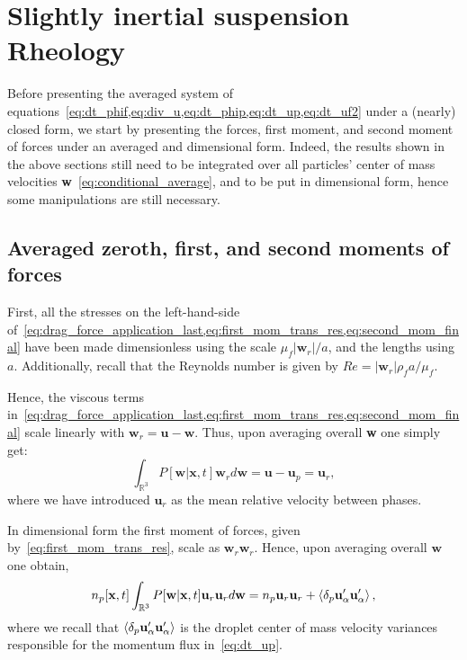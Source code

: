 
\section{Slightly inertial suspension Rheology}\label{sec:averaged_equations}
Before presenting the averaged system of equations~\eqref{eq:dt_phif,eq:div_u,eq:dt_phip,eq:dt_up,eq:dt_uf2} under a (nearly) closed form, we start by presenting the forces, first moment, and second moment of forces  under an  averaged and dimensional form. 
Indeed, the results shown in the above sections still need to be integrated over all particles' center of mass velocities \textbf{w}~\eqref{eq:conditional_average}, and to be put in dimensional form, hence some manipulations are still necessary.



\subsection{Averaged zeroth, first, and second moments of forces}

First, all the stresses on the left-hand-side of~\ref{eq:drag_force_application_last,eq:first_mom_trans_res,eq:second_mom_final} have been made dimensionless using the scale $\mu_f |\textbf{w}_r|/a$, and the lengths using $a$.
Additionally, recall that the Reynolds number is given by $Re= |\textbf{w}_r|\rho_f a/\mu_f$. 

Hence, the viscous terms in~\ref{eq:drag_force_application_last,eq:first_mom_trans_res,eq:second_mom_final} scale linearly with $\textbf{w}_r = \textbf{u} - \textbf{w}$.
Thus, upon averaging overall \textbf{w} one simply get: 
\begin{equation}
    \int_{\mathbb{R}^3} P[\textbf{w}|\textbf{x},t]
    \textbf{w}_r d\textbf{w} = \textbf{u} - \textbf{u}_p = \textbf{u}_r,
\end{equation}
where we have introduced $\textbf{u}_r$ as the mean relative velocity between phases. 

In dimensional form the first moment of forces, given by~\ref{eq:first_mom_trans_res}, scale as $\textbf{w}_r\textbf{w}_r$.
Hence, upon averaging overall $\textbf{w}$ one obtain,   
\begin{equation}
    n_p[\textbf{x},t]\int_{\mathbb{R}^3} P[\textbf{w}|\textbf{x},t]
    \textbf{u}_r\textbf{u}_r d\textbf{w}
    = 
    n_p \textbf{u}_r \textbf{u}_r
    + \pavg{\textbf{u}_\alpha'\textbf{u}_\alpha'},
    \label{eq:standard_dev1}
\end{equation}
where we recall that $\left<\delta_{p} \textbf{u}_\alpha'\textbf{u}_\alpha'\right>$ is the droplet center of mass velocity variances responsible for the momentum flux in~\ref{eq:dt_up}. 

